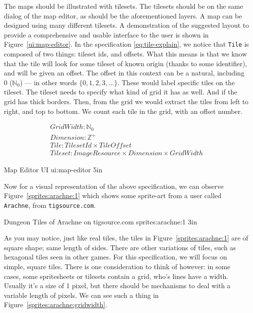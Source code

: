 The maps should be illustrated with tilesets. The tilesets should be on the
same dialog of the map editor, as should be the aforementioned layers. A map
can be designed using many different tilesets. A demonstration of the
suggested layout to provide a comprehensive and usable interface to the user
is shown in Figure~\ref{ui:map-editor}. In the specification
\ref{eq:tile-explain}, we notice that \texttt{Tile} is composed of two things:
tileset ids, and offsets. What this means is that we know that the tile will
look for some tileset of known origin (thanks to some identifier), and will be
given an offset. The offset in this context can be a natural, including 0
($\mathbb{N}_0$) --- in other words $\{ 0, 1, 2, 3, ... \}$. These would label
specific tiles on the tileset. The tileset needs to specify what kind of grid
it has as well. And if the grid has thick borders. Then, from the grid we would
extract the tiles from left to right, and top to bottom. We count each tile in
the grid, with an offset number.

\begin{equation}
  \begin{split} \label{eq:tile-explain}
  GridWidth\colon \mathbb{N}_0 \\
  Dimension\colon \mathbb{Z}^+ \\
  Tile\colon TilesetId \times TileOffset \\
  Tileset\colon ImageResource \times Dimension \times GridWidth
\end{split}
\end{equation}

%
       {Map Editor UI}%
       {ui:map-editor}%
       {5in}

Now for a visual representation of the above specification, we can observe
Figure~\ref{sprites:arachne:1} which shows some sprite-art from a user called
\texttt{Arachne}, from \texttt{tigsource.com}.

%
       {Dungeon Tiles of Arachne on tigsource.com \cite{arachnesprite1}}%
       {sprites:arachne:1}%
       {3in}

As you may notice, just like real tiles, the tiles in
Figure~\ref{sprites:arachne:1} are of square shape; same length of sides. There
are other variations of tiles, such as hexagonal tiles seen in other games. For
this specification, we will focus on simple, square tiles. There is one
consideration to think of however: in some cases, some spritesheets or tilesets
contain a grid, who's lines have a width. Usually it's a size of 1 pixel, but
there should be mechanisms to deal with a variable length of pixels. We can see
such a thing in Figure~\ref{sprites:arachne:gridwidth}.

